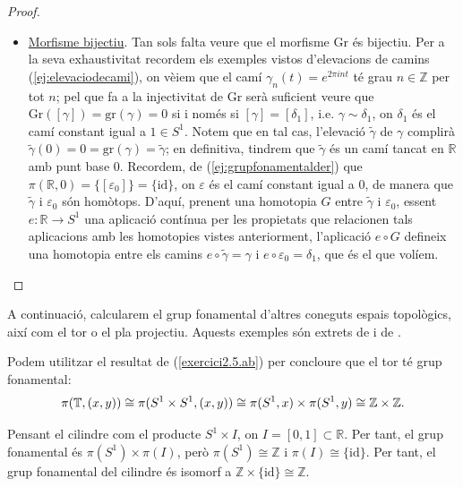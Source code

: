\documentclass[../main.tex]{subfiles}
\begin{document}
\begin{proof}
\begin{itemize}
    
    \item \underline{Morfisme bijectiu}. Tan sols falta veure que el morfisme $\mathrm{Gr}$ és bijectiu. Per a la seva exhaustivitat recordem els exemples vistos d'elevacions de camins (\ref{ej:elevaciodecami}), on vèiem que el camí $\gamma_n(t) = e^{2\pi int}$ té grau $n\in\mathbb{Z}$ per tot $n$; pel que fa a la injectivitat de Gr serà suficient veure que $\mathrm{Gr}([\gamma]) = \mathrm{gr}(\gamma) = 0$ si i només si $[\gamma] = [\delta_1]$, i.e. $\gamma\sim \delta_1$, on $\delta_1$ és el camí constant igual a $1\in S^1$. Notem que en tal cas, l'elevació $\tilde{\gamma}$ de $\gamma$ complirà $\tilde{\gamma}(0) = 0 = \mathrm{gr}(\gamma) = \tilde{\gamma}$; en definitiva, tindrem que $\tilde{\gamma}$ és un camí tancat en $\mathbb{R}$ amb punt base 0. Recordem, de (\ref{ej:grupfonamentalder}) que $\pi(\mathbb{R},0) = \{[\varepsilon_0]\} = \{\mathrm{id}\}$, on $\varepsilon$ és el camí constant igual a 0, de manera que $\tilde{\gamma}$ i $\varepsilon_0$ són homòtops. D'aquí, prenent una homotopia $G$ entre $\tilde{\gamma}$ i $\varepsilon_0$, essent $e:\mathbb{R}\rightarrow S^1$ una aplicació contínua per les propietats que relacionen tals aplicacions amb les homotopies vistes anteriorment, l'aplicació $e\circ G$ defineix una homotopia entre els camins $e\circ\tilde{\gamma} = \gamma$ i $e\circ\varepsilon_0 = \delta_1$, que és el que volíem.
\end{itemize}
\end{proof}







A continuació, calcularem el grup fonamental d'altres coneguts espais topològics, així com el tor o el pla projectiu. Aquests exemples són extrets de \cite{topologiaparausuarios} i de \cite{mathonline}. 

\begin{ej}
 Podem utilitzar el resultat de (\ref{exercici2.5.ab}) per concloure que el tor té grup fonamental:
\begin{equation}
    \notag
    \pi(\mathbb{T}, (x,y)) \cong \pi(S^1\times S^1, (x,y)) \cong \pi(S^1,x)\times \pi(S^1,y)\cong \mathbb{Z}\times\mathbb{Z}.
\end{equation}
\end{ej}

\begin{ej}
 Pensant el cilindre com el producte $S^1\times I$, on $I=[0,1]\subset\mathbb{R}$. Per tant, el grup fonamental és $\pi(S^1)\times \pi(I)$, però $\pi(S^1) \cong \mathbb{Z}$ i $\pi(I)\cong \{\mathrm{id}\}$. Per tant, el grup fonamental del cilindre és isomorf a $\mathbb{Z}\times\{\mathrm{id}\}\cong \mathbb{Z}$.
\end{ej}
\end{document}
